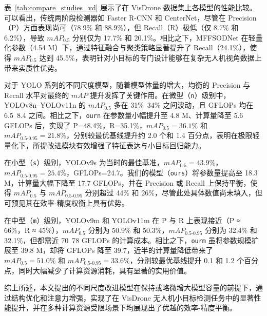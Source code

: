 \documentclass[runningheads]{llncs}
\begin{document}

表~\ref{tab:compare_studies_vd} 展示了在 VisDrone 数据集上各模型的性能比较。可以看出，传统两阶段检测器如 Faster R-CNN 和 CenterNet，尽管在 Precision（P）方面表现尚可（78.9\% 和 88.9\%），但 Recall（R）极低（仅 8.7\% 和 6.2\%），导致 $mAP_{0.5}$ 分别仅为 17.7\% 和 20.1\%。相比之下，MFFSODNet 在轻量化参数（4.54 M）下，通过特征融合与聚类策略显著提升了 Recall（24.1\%），使得 $mAP_{0.5}$ 达到 45.5\%，表明针对小目标的专门设计能够在复杂无人机视角数据上带来实质性优势。

对于 YOLO 系列的不同尺度模型，随着模型体量的增大，均衡的 Precision 与 Recall 水平对最终的 $mAP$ 提升发挥了关键作用。在微型（\texttt{n}）级别中，YOLOv8n–YOLOv11n 的 $mAP_{0.5}$ 多在 31\%~34\% 之间波动，且 GFLOPs 均在 6.5~8.4 之间。相比之下，\texttt{ourn} 在参数量小幅提升至 4.8 M、计算量降至 5.6 GFLOPs 后，实现了 P=48.4\%，R=35.1\%，$mAP_{0.5}=36.1\%$ 和 $mAP_{0.5\text{-}0.95}=21.8\%$，分别较最优基线提升约 2.0 个和 1.4 百分点，表明在极限轻量化下，所提改进模块有效增强了特征表达与小目标回归能力。

在小型（\texttt{s}）级别，YOLOv9s 为当时的最佳基准，$mAP_{0.5}=43.9\%$，$mAP_{0.5\text{-}0.95}=25.4\%$，GFLOPs=24.7。我们的模型（\texttt{ours}）将参数量提高至 18.3 M，计算量大幅下降至 17.7 GFLOPs，并在 Precision 或 Recall 上保持平衡，使得 $mAP_{0.5}$ 与 $mAP_{0.5\text{-}0.95}$ 分别超过 44\% 和 26\%，尽管此处具体数值尚未填入，但可预见其在效率-精度权衡上具有优势。

在中型（\texttt{m}）级别，YOLOv9m 和 YOLOv11m 在 P 与 R 上表现接近（P ≈ 66\%，R ≈ 45\%），$mAP_{0.5}$ 分别为 50.9\% 和 50.3\%，$mAP_{0.5\text{-}0.95}$ 分别为 32.4\% 和 32.1\%，但都需近 70~78 GFLOPs 的计算成本。相比之下，\texttt{ourm} 虽将参数规模扩展至 39.8 M，却将 GFLOPs 降至 39.7，近半的计算量降低带来了 $mAP_{0.5}=51.0\%$ 和 $mAP_{0.5\text{-}0.95}=33.6\%$，分别较最优基线提升 0.1 和 1.2 个百分点，同时大幅减少了计算资源消耗，具有显著的实用价值。

综上所述，本文提出的不同尺度改进模型在保持或略微增大模型容量的前提下，通过结构优化和注意力增强，实现了在 VisDrone 无人机小目标检测任务中的显著性能提升，并在多种计算资源受限场景下均展现出了优越的效率-精度平衡。
\end{document}
